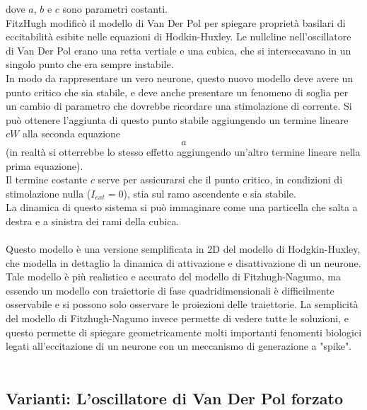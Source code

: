 \documentclass[12pt]{article}
\begin{document}
dove $a$, $b$ e $c$ sono parametri costanti. \\
FitzHugh modificò il modello di Van Der Pol per spiegare proprietà basilari di eccitabilità esibite nelle equazioni di Hodkin-Huxley. Le nullcline nell'oscillatore di Van Der Pol erano una retta vertiale e una cubica, che si intersecavano in un singolo punto che era sempre instabile. \\
In modo da rappresentare un vero neurone, questo nuovo modello deve avere un punto critico che sia stabile, e deve anche presentare un fenomeno di soglia per un cambio di parametro che dovrebbe ricordare una stimolazione di corrente. Si può ottenere l'aggiunta di questo punto stabile aggiungendo un termine lineare $cW$ alla seconda equazione $$a$$ (in realtà si otterrebbe lo stesso effetto aggiungendo un'altro termine lineare nella prima equazione). \\
Il termine costante $c$ serve per assicurarsi che il punto critico, in condizioni di stimolazione nulla ($I_{ext} = 0$), stia sul ramo ascendente e sia stabile. \\
La dinamica di questo sistema si può immaginare come una particella che salta a destra e a sinistra dei rami della cubica. \\ \\
Questo modello è una versione semplificata in 2D del modello di Hodgkin-Huxley, che modella in dettaglio la dinamica di attivazione e disattivazione di un neurone. Tale modello è più realistico e accurato del modello di Fitzhugh-Nagumo, ma essendo un modello con traiettorie di fase quadridimensionali è difficilmente osservabile e si possono solo osservare le proiezioni delle traiettorie. La semplicità del modello di Fitzhugh-Nagumo invece permette di vedere tutte le soluzioni, e questo permette di spiegare geometricamente molti importanti fenomenti biologici legati all'eccitazione di un neurone con un meccanismo di generazione a "spike". \\ \\
\subsection{Varianti: L'oscillatore di Van Der Pol forzato}
\end{document}
